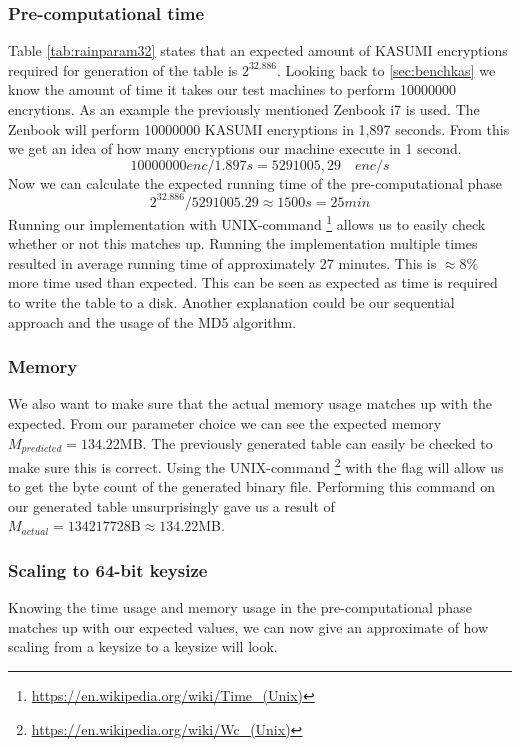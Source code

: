 \subsubsection{Pre-computational time}
Table \ref{tab:rainparam32} states that an expected amount of
KASUMI encryptions required for generation of the table is
$2^{32.886}$. Looking back to \ref{sec:benchkas} we know the
amount of time it takes our test machines to perform 10000000 encrytions. As an
example the previously mentioned Zenbook i7 is used. The
Zenbook will perform 10000000 KASUMI encryptions in 1,897
seconds. From this we get an idea of how many encryptions our
machine execute in 1 second.
\[10000000 enc / 1.897 s = 5291005,29 \quad enc/s\]
Now we can calculate the expected running time of the
pre-computational phase
\[2^{32.886} / 5291005.29 \approx 1500s = 25 min \]
Running our implementation with UNIX-command
\footnote{\url{https://en.wikipedia.org/wiki/Time_(Unix)}}
allows us to easily check whether or not this matches up. Running the
implementation multiple times resulted in average running time of
approximately 27 minutes. This is $\approx8\%$ more time used than
expected. This can be seen as expected as time is required to write
the table to a disk. Another explanation could be our sequential
approach and the usage of the MD5 algorithm.

\subsubsection{Memory}

We also want to make sure that the actual memory usage matches up with
the expected. From our parameter choice we can see the expected memory
$M_{predicted}=134.22$MB. The previously generated table can easily be
checked to make sure this is correct. Using the UNIX-command
\footnote{\url{https://en.wikipedia.org/wiki/Wc_(Unix)}} with
the  flag will allow us to get the byte count of the
generated binary file. Performing this command on our generated table
unsurprisingly gave us a result of
$M_{actual}=134217728\text{B}\approx134.22$MB.

\subsubsection{Scaling to 64-bit keysize}
Knowing the time usage and memory usage in the pre-computational phase
matches up with our expected values, we can now give an approximate of
how scaling from a  keysize to a  keysize
will look.

